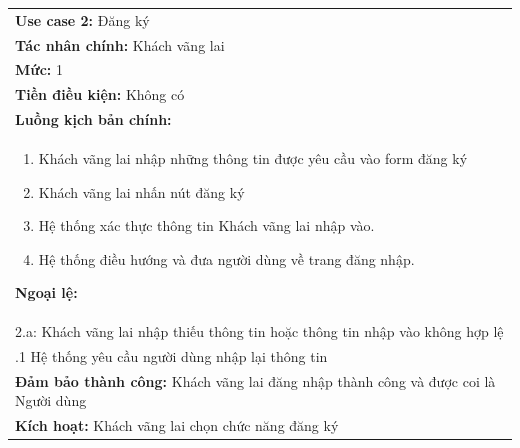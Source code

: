 \begin{center}
\begin{tabularx}{\linewidth}{|X|}
\cline{1-2}
    \textbf{Use case 2:} Đăng ký\\
    \textbf{Tác nhân chính:} Khách vãng lai\\
    \textbf{Mức:} 1\\
    \textbf{Tiền điều kiện:} Không có\\
    \textbf{Luồng kịch bản chính:}\\
    \begin{enumerate}
        \vspace{-2em}
        \itemsep-0.5em
        \item Khách vãng lai nhập những thông tin được yêu cầu vào form đăng ký 
        \item Khách vãng lai nhấn nút đăng ký
        \item Hệ thống xác thực thông tin Khách vãng lai nhập vào.
        \item Hệ thống điều hướng và đưa người dùng về trang đăng nhập.
        \vspace{-1em}
    \end{enumerate}
    \textbf{Ngoại lệ:}\\
    \hspace{1em}2.a: Khách vãng lai nhập thiếu thông tin hoặc thông tin nhập vào không hợp lệ\\
    \hspace{2.5em}.1 Hệ thống yêu cầu người dùng nhập lại thông tin\\
    \textbf{Đảm bảo thành công:} Khách vãng lai đăng nhập thành công và được coi là Người dùng\\
    \textbf{Kích hoạt:} Khách vãng lai chọn chức năng đăng ký
\cline{1-2}
\end{tabularx}
\end{center}

